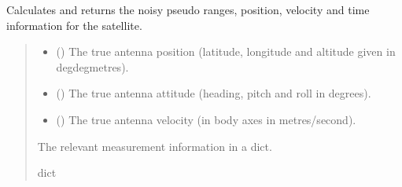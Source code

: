 \documentclass[letterpaper,10pt,english]{sphinxmanual}
\begin{document}
\begin{fulllineitems}
\begin{fulllineitems}
\label{\detokenize{modules/gps/satellite:qnav.gps.satellite.Satellite.get_measurements}}
\pysigstartsignatures
{}
\pysigstopsignatures
\sphinxAtStartPar
Calculates and returns the noisy pseudo ranges, position, velocity
and time information for the satellite.
\begin{quote}\begin{description}
\begin{itemize}
\item {} 
\sphinxAtStartPar
{} (\sphinxstyleliteralemphasis{\sphinxupquote{ (}}\sphinxstyleliteralemphasis{\sphinxupquote{)}}) \textendash{} The true antenna position (latitude, longitude
and altitude given in deg\sphinxhyphen{}deg\sphinxhyphen{}metres).

\item {} 
\sphinxAtStartPar
{} (\sphinxstyleliteralemphasis{\sphinxupquote{ (}}\sphinxstyleliteralemphasis{\sphinxupquote{)}}) \textendash{} The true antenna attitude (heading, pitch and roll
in degrees).

\item {} 
\sphinxAtStartPar
{} (\sphinxstyleliteralemphasis{\sphinxupquote{ (}}\sphinxstyleliteralemphasis{\sphinxupquote{)}}) \textendash{} The true antenna velocity (in body axes in
metres/second).

\end{itemize}

\sphinxAtStartPar
The relevant measurement information in a dict.

\sphinxAtStartPar
dict


\end{description}
\end{quote}
\end{fulllineitems}
\end{fulllineitems}
\end{document}

